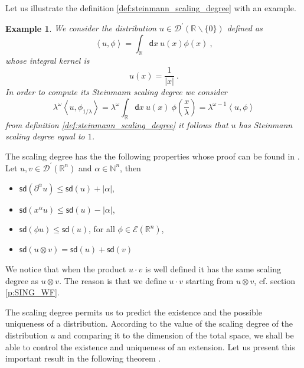 \documentclass[11pt]{book}
\newcommand{\sd}{\mathsf{sd}}
\newcommand{\abs}[1]{\left|#1\right|}
\newcommand{\sm}[1]{\left\langle#1\right\rangle}
\newcommand{\Dcal}{\mathcal{D}}
\newcommand{\Ecal}{\mathcal{E}}
\newcommand{\Nbb}{\mathbb{N}}
\newcommand{\Rbb}{\mathbb{R}}
\newcommand{\dsf}{\mathsf{d}}
\theoremstyle{break}
\newtheorem{example}{Example}[chapter]
\begin{document}
Let us illustrate the definition \ref{def:steinmann_scaling_degree} with an example.


\begin{example}
We consider the distribution $u \in \Dcal^\prime(\Rbb \backslash \{0\})$ defined as 
%
\begin{equation*}
\sm{u, \phi} = \int_{\Rbb} \dsf x \ u(x) \phi(x)  \ ,
\end{equation*}
%
whose integral kernel is 
%
\begin{equation*}
u(x) = \frac{1}{\abs{x}} \ .
\end{equation*}
%
In order to compute its Steinmann scaling degree we consider
%
\begin{equation*}
\lambda^\omega \sm{u,\phi_{1/\lambda}} = \lambda^\omega \int_\Rbb \dsf x \ u(x) \ \phi\left(\frac{x}{\lambda}\right) = \lambda^{\omega-1} \sm{u , \phi} 
\end{equation*}
% 
from definition \ref{def:steinmann_scaling_degree} it follows that $u$ has Steinmann scaling degree equal to $1$.
\end{example}


The scaling degree has the the following properties whose proof can be found in \cite[theorem 5.1]{BF_2000}. Let $u, v \in\Dcal^\prime(\Rbb^n)$ and $\alpha \in \Nbb^n$, then
%
\begin{itemize}
\setlength\itemsep{0pt}
\item $\sd(\partial^\alpha u) \leq \sd(u) + \abs{\alpha}$,
\item $\sd(x^\alpha u) \leq \sd(u) - \abs{\alpha}$,
\item $\sd(\phi u) \leq \sd(u)$, for all $\phi \in \Ecal(\Rbb^n)$, 
\item $\sd(u \otimes v) = \sd(u) + \sd(v)$
\end{itemize}
%
We notice that when the product $u \cdot v$ is well defined it has the same scaling degree as $u \otimes v$. The reason is that we define $u \cdot v$ starting from $u \otimes v$, cf. section \ref{p:SING_WF}.


The scaling degree permits us to predict the existence and the possible uniqueness of a distribution. According to the value of the scaling degree of the distribution $u$ and comparing it to the dimension of the total space, we shall be able to control the existence and uniqueness of an extension. Let us present this important result in the following theorem \cite[theorems 5.2 and 5.3]{BF_2000}.
\end{document}
